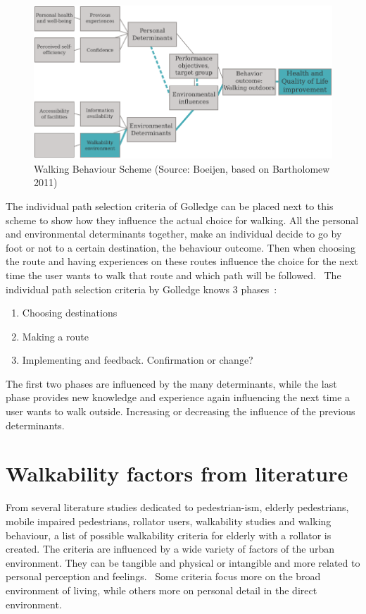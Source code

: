 \begin{figure}[h]
\includegraphics[width=\textwidth]{img/B_bartolomew.pdf}
\centering
\caption[Walking Behaviour Scheme]{Walking Behaviour Scheme (Source: Boeijen, based on Bartholomew 2011)
\label{behaviour}}
\end{figure}

The individual path selection criteria of Golledge can be placed next to this scheme to show how they influence the actual choice for walking. All the personal and environmental determinants together, make an individual decide to go by foot or not to a certain destination, the behaviour outcome. Then when choosing the route and having experiences on these routes influence the choice for the next time the user wants to walk that route and which path will be followed.~\cite{Golledge2002} The individual path selection criteria by Golledge knows 3 phases~\cite{Golledge2002}: 
\begin{enumerate}
\item Choosing destinations 
\item Making a route 
\item Implementing and feedback. Confirmation or change?
\end{enumerate}
The first two phases are influenced by the many determinants, while the last phase provides new knowledge and experience again influencing the next time a user wants to walk outside. Increasing or decreasing the influence of the previous determinants. 

\section{Walkability factors from literature}
From several literature studies dedicated to pedestrian-ism, elderly pedestrians, mobile impaired pedestrians, rollator users, walkability studies and walking behaviour, a list of possible walkability criteria for elderly with a rollator is created. The criteria are influenced by a wide variety of factors of the urban environment. They can be tangible and physical or intangible and more related to personal perception and feelings.~\cite{Verschuur2013} Some criteria focus more on the broad environment of living, while others more on personal detail in the direct environment. 

